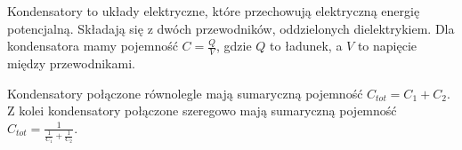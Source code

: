 \documentclass{../notatki}
\begin{document}
Kondensatory to układy elektryczne, które przechowują elektryczną energię
potencjalną. Składają się z dwóch przewodników, oddzielonych dielektrykiem.
Dla kondensatora mamy pojemność $C = \frac{Q}{V}$, gdzie $Q$ to ładunek, a $V$
to napięcie między przewodnikami.
\begin{figure*}[h]
  \centering
\end{figure*}
Kondensatory połączone równolegle mają sumaryczną pojemność $C_{tot}
= C_1 + C_2$. Z kolei kondensatory połączone szeregowo mają sumaryczną pojemność
$C_{tot} = \frac{1}{\frac{1}{C_1} + \frac{1}{C_2}}$.
\end{document}
